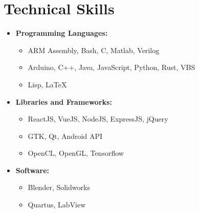 \documentclass[10pt,letterpaper,sans]{moderncv}
\begin{document}
\section{Technical Skills}
\begin{itemize}
\item \textbf{Programming Languages:}
  \begin{itemize}
    \item {} ARM Assembly, Bash, C, Matlab, Verilog
    \item {} Arduino, C++, Java, JavaScript, Python, Rust, VBS
    \item {} Lisp, \LaTeX
  \end{itemize}
\item \textbf{Libraries and Frameworks:} 
  \begin{itemize}
  \item {} ReactJS, VueJS, NodeJS, ExpressJS, jQuery
  \item {} GTK, Qt, Android API
  \item {} OpenCL, OpenGL, Tensorflow
  \end{itemize}
\item \textbf{Software:} 
  \begin{itemize}
  \item {} Blender, Solidworks
  \item {} Quartus, LabView
  \end{itemize}
\end{itemize}
\end{document}
